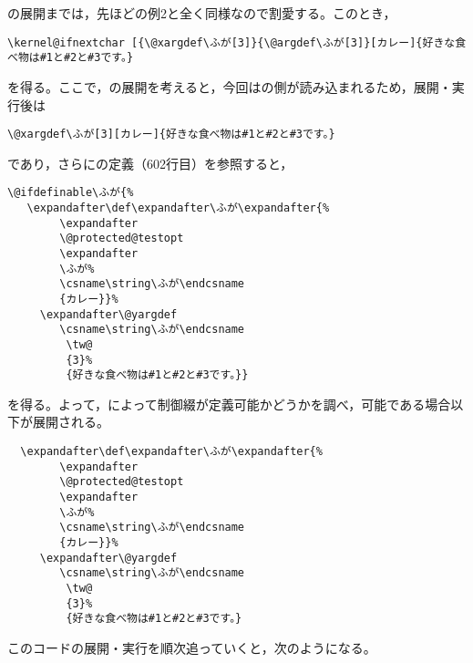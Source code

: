 \documentclass[autodetect-engine,dvipdfmx]{jsarticle}
\begin{document}
の展開までは，先ほどの例2と全く同様なので割愛する。このとき，

\begin{lstlisting}
\kernel@ifnextchar [{\@xargdef\ふが[3]}{\@argdef\ふが[3]}[カレー]{好きな食べ物は#1と#2と#3です。}
\end{lstlisting}

を得る。ここで，の展開を考えると，今回はの側が読み込まれるため，展開・実行後は
\begin{lstlisting}
\@xargdef\ふが[3][カレー]{好きな食べ物は#1と#2と#3です。}
\end{lstlisting}
であり，さらにの定義（602行目）を参照すると，

\begin{lstlisting}
\@ifdefinable\ふが{%
   \expandafter\def\expandafter\ふが\expandafter{%
        \expandafter
        \@protected@testopt
        \expandafter
        \ふが%
        \csname\string\ふが\endcsname
        {カレー}}%
     \expandafter\@yargdef
        \csname\string\ふが\endcsname
         \tw@
         {3}%
         {好きな食べ物は#1と#2と#3です。}}
\end{lstlisting}

を得る。よって，によって制御綴が定義可能かどうかを調べ，可能である場合以下が展開される。

\begin{lstlisting}
  \expandafter\def\expandafter\ふが\expandafter{%
        \expandafter
        \@protected@testopt
        \expandafter
        \ふが%
        \csname\string\ふが\endcsname
        {カレー}}%
     \expandafter\@yargdef
        \csname\string\ふが\endcsname
         \tw@
         {3}%
         {好きな食べ物は#1と#2と#3です。}
\end{lstlisting}

このコードの展開・実行を順次追っていくと，次のようになる。
\end{document}
